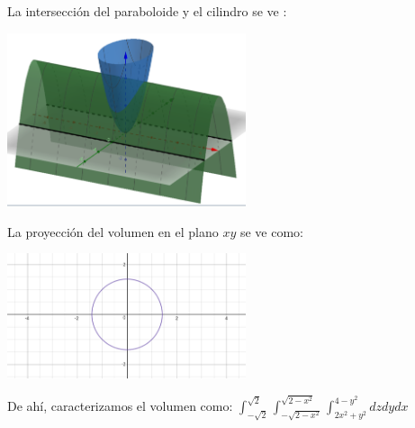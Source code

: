 \documentclass{article}
\begin{document}
\begin{enumerate}
{        La intersección del paraboloide y el cilindro se ve :
        \begin{center}
            \includegraphics[width=7cm]{img/ejercicio7.png}
        \end{center}
        La proyección del volumen en el plano $xy$ se ve como:
        \begin{center}
            \includegraphics[width=7cm]{img/ejercicio71.png}\\
        \end{center}
        De ahí, caracterizamos el volumen como: $\displaystyle\int_{-\sqrt{2}}^{\sqrt{2}}\int_{-\sqrt{2-x^2}}^{\sqrt{2-x^2}}\int_{2x^2+y^2}^{4-y^2}dzdydx$

}
\end{enumerate}
\end{document}
